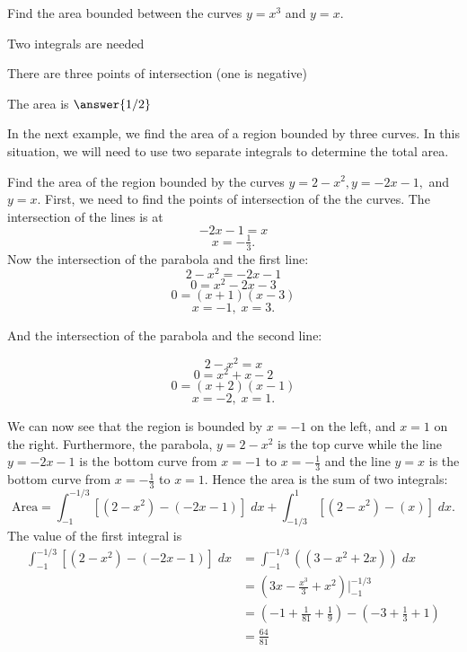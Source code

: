 \documentclass{ximera}
\begin{document}
\begin{problem}
Find the area bounded between the curves $y = x^3$ and $y = x$.
\begin{hint}
Two integrals are needed
\end{hint}
\begin{hint}
There are three points of intersection (one is negative)
\end{hint}
The area is $\answer{1/2}$

\end{problem}



In the next example, we find the area of a region bounded by three curves. In this situation, we will need to use two separate integrals to determine the total area.

\begin{example}
Find the area of the region bounded by the curves $y = 2-x^2, y = -2x-1,$ and $y = x$.
First, we need to find the points of intersection of the the curves. The intersection of the lines is at
\[
-2x-1 = x 
\]
\[
x = -\tfrac13.
\]
Now the intersection of the parabola and the first line:
\[
 2-x^2 = -2x-1
\]
\[
   0 = x^2 -2x -3 
\]
\[
   0 = (x+1)(x-3)
\]
\[
    x = -1, \; x = 3.
\]

And the intersection of the parabola and the second line:

\[
 2-x^2 = x
\]
\[
   0 =x^2 +x -2
\]
\[
   0 =(x+2)(x-1)
\]
\[
   x = -2, \; x = 1.
\]

We can now see that the region is bounded by $x = -1$ on the left, and  $x = 1$ on the right.
Furthermore, the parabola, $y = 2 - x^2$ is the top curve while the line $y = -2x-1$ is the bottom curve 
from $x = -1$ to $x = -\frac13$ and the line $y = x$ is the bottom curve from $x = -\frac13$ to $x = 1$.
Hence the area is the sum of two integrals:
\[
\text{Area} = \int_{-1}^{-1/3} \left[(2 - x^2) - (-2x-1)\right] \; dx + \int_{-1/3}^1 \left[(2 - x^2) - (x)\right] \; dx.
\]
The value of the first integral is
\begin{align*}
\int_{-1}^{-1/3} \left[(2 - x^2) - (-2x-1)\right] \; dx &= \int_{-1}^{-1/3} \left((3 - x^2 +2x)\right) \; dx \\
                                                        &= \left(3x - \frac{x^3}{3} + x^2 \right)\bigg|_{-1}^{-1/3} \\
                                                        &= \left(-1 + \tfrac{1}{81} + \tfrac19 \right) - \left(-3 + \tfrac13 + 1 \right) \\
                                                        &= \tfrac{64}{81}
\end{align*}


\end{example}
\end{document}
